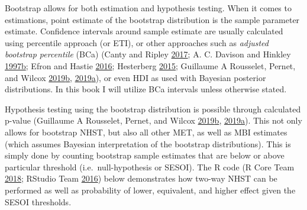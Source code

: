 \documentclass[
]{book}
\begin{document}
Bootstrap allows for both estimation and hypothesis testing. When it comes to estimations, point estimate of the bootstrap distribution is the sample parameter estimate. Confidence intervals around sample estimate are usually calculated using percentile approach (or ETI), or other approaches such as \emph{adjusted bootstrap percentile} (BCa) (Canty and Ripley \protect\hyperlink{ref-cantyBootBootstrapSPlus2017}{2017}; A. C. Davison and Hinkley \protect\hyperlink{ref-davisonBootstrapMethodsTheir1997}{1997}\protect\hyperlink{ref-davisonBootstrapMethodsTheir1997}{b}; Efron and Hastie \protect\hyperlink{ref-efronComputerAgeStatistical2016}{2016}; Hesterberg \protect\hyperlink{ref-hesterbergWhatTeachersShould2015}{2015}; Guillaume A Rousselet, Pernet, and Wilcox \protect\hyperlink{ref-rousseletPercentileBootstrapTeaser2019}{2019}\protect\hyperlink{ref-rousseletPercentileBootstrapTeaser2019}{b}, \protect\hyperlink{ref-rousseletPracticalIntroductionBootstrap2019}{2019}\protect\hyperlink{ref-rousseletPracticalIntroductionBootstrap2019}{a}), or even HDI as used with Bayesian posterior distributions. In this book I will utilize BCa intervals unless otherwise stated.

Hypothesis testing using the bootstrap distribution is possible through calculated p-value (Guillaume A Rousselet, Pernet, and Wilcox \protect\hyperlink{ref-rousseletPercentileBootstrapTeaser2019}{2019}\protect\hyperlink{ref-rousseletPercentileBootstrapTeaser2019}{b}, \protect\hyperlink{ref-rousseletPracticalIntroductionBootstrap2019}{2019}\protect\hyperlink{ref-rousseletPracticalIntroductionBootstrap2019}{a}). This not only allows for bootstrap NHST, but also all other MET, as well as MBI estimates (which assumes Bayesian interpretation of the bootstrap distributions). This is simply done by counting bootstrap sample estimates that are below or above particular threshold (i.e.~null-hypothesis or SESOI). The R code (R Core Team \protect\hyperlink{ref-rcoreteamLanguageEnvironmentStatistical2018}{2018}; RStudio Team \protect\hyperlink{ref-rstudioteamRStudioIntegratedDevelopment2016}{2016}) below demonstrates how two-way NHST can be performed as well as probability of lower, equivalent, and higher effect given the SESOI thresholds.
\end{document}
